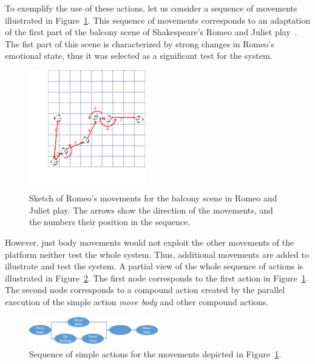 To exemplify the use of these actions, let us consider a sequence of movements illustrated in Figure~\ref{fig:triskar_test}. This sequence of movements corresponds to an adaptation of the first part of the balcony scene of Shakespeare's Romeo and Juliet play~\cite{RAndJ}. The fist part of this scene is characterized by strong changes in Romeo's emotional state, thus it was selected as a significant test for the system.  
\begin{figure}
	\centering
	\includegraphics[width=0.45\textwidth]{./Images/FourthCaseSceneB.png}
	\caption{Sketch of Romeo's movements for the balcony scene in Romeo and Juliet play. The arrows show the direction of the movements, and the numbers their position in the sequence.}
	\label{fig:triskar_test}
\end{figure} 
However, just body movements would not exploit the other movements of the platform neither test the whole system. Thus, additional movements are added to illustrate and test the system. A partial view of the whole sequence of actions is illustrated in Figure~\ref{fig:sequence_actions}. The first node corresponds to the first action in Figure~\ref{fig:triskar_test}. The second node corresponds to a compound action created by the parallel execution of the simple action \textit{move body} and other compound actions.

\begin{figure}
	\centering
	\includegraphics[width=0.5\textwidth]{./Images/sequenceActions.png}
	\caption{Sequence of simple actions for the movements depicted in Figure~\ref{fig:triskar_test}.}
	\label{fig:sequence_actions}
\end{figure}
